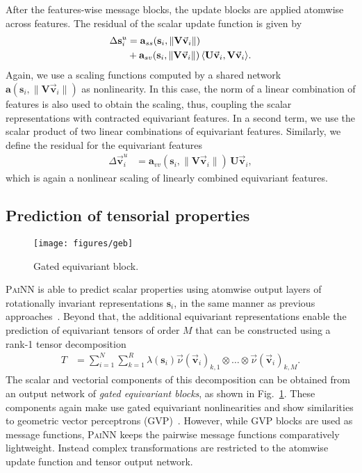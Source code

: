 \documentclass[reprint,
amsmath,amssymb,
 aip,jcp
]{revtex4-2}
\newcommand{\painn}{\textsc{PaiNN}}
\newcommand{\q}{\mathbf{s}}
\newcommand{\mmu}{\vec{\mathbf{v}}}
\newcommand{\new}[1]{#1}
\begin{document}
After the features-wise message blocks, the update blocks are applied atomwise across features.
The residual of the scalar update function is given by
\begin{align}
\Delta \q_i^u &= \mathbf{a}_{ss}(\q_i, \| \mathbf{V} \mmu_i \|) \label{eq:updv} \\ 
&+ \mathbf{a}_{sv}(\q_i, \| \mathbf{V} \mmu_i \|) \, \langle \mathbf{U} \mmu_i, \mathbf{V} \mmu_i \rangle. \notag
\end{align}
Again, we use a scaling functions computed by a shared network $\mathbf{a}(\q_i, \| \mathbf{V} \mmu_i \|)$ as nonlinearity.
In this case, the norm of a linear combination of features is also used to obtain the scaling, thus, coupling the scalar representations with contracted equivariant features.
In a second term, we use the scalar product of two linear combinations of equivariant features.
Similarly, we define the residual for the equivariant features
\begin{align}
\Delta \mmu_i^u &= \mathbf{a}_{vv}(\q_i, \| \mathbf{V} \mmu_i \|) \,  \mathbf{U} \mmu_i,
\end{align}
which is again a nonlinear scaling of linearly combined equivariant features.

\subsection{Prediction of tensorial properties}\label{sec:tensprop}
\begin{figure}[tb]
\centering
\texttt{[image: figures/geb]}
\caption{Gated equivariant block.\label{fig:geb}}
\end{figure}

\painn{} is able to predict scalar properties using atomwise output layers of rotationally invariant representations $\q_i$, in the same manner as previous approaches~\cite{schutt2017deep,unke2019physnet}.
Beyond that, the additional equivariant representations enable the prediction of equivariant tensors of order $M$ that can be constructed using a rank-1 tensor decomposition
\begin{align}
    T &= \sum_{i=1}^N \sum_{k=1}^R \lambda(\q_i)  \vec{\nu}(\mmu_i)_{k,1} \otimes \dots \otimes \vec{\nu}(\mmu_i)_{k,M}. \label{eq:tpred}
\end{align}
The scalar and vectorial components of this decomposition can be obtained from an output network of \emph{gated equivariant blocks}, as shown in Fig.~\ref{fig:geb}.
\new{These components again make use gated equivariant nonlinearities \cite{weiler2018learning} and show similarities to geometric vector perceptrons (GVP)~\cite{jing2021learning}.
However, while GVP blocks are used as message functions, \painn{} keeps the pairwise message functions comparatively lightweight.
Instead complex transformations are restricted to the atomwise update function and tensor output network.}
\end{document}
